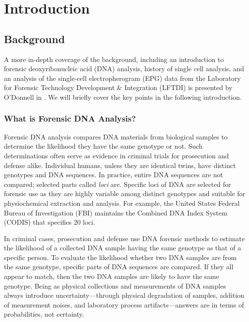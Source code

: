 
\chapter{Introduction}
\label{ch:Introduction}
\thispagestyle{myheadings}

\section{Background}

A more in-depth coverage of the background, including an introduction to forensic deoxyribonucleic acid (DNA) analysis, history of single cell analysis, and an analysis of the single-cell electropherogram (EPG) data from the Laboratory for Forensic Technology Development \& Integration (LFTDI) is presented by O'Donnell in \cite{odonnell_clustering_2021}. We will briefly cover the key points in the following introduction.

\subsection{What is Forensic DNA Analysis?}

Forensic DNA analysis compares DNA materials from biological samples to determine the likelihood they have the same genotype or not. Such determinations often serve as evidence in criminal trials for prosecution and defense alike. Individual humans, unless they are identical twins, have distinct genotypes and DNA sequences. In practice, entire DNA sequences are not compared; selected parts called \emph{loci} are. Specific loci of DNA are selected for forensic use as they are highly variable among distinct genotypes and suitable for physiochemical extraction and analysis. For example, the United States Federal Bureau of Investigation (FBI) maintains the Combined DNA Index System (CODIS) \cite{noauthor_codis_nodate} that specifies 20 loci.

In criminal cases, prosecution and defense use DNA forensic methods to estimate the likelihood of a collected DNA sample having the same genotype as that of a specific person. To evaluate the likelihood whether two DNA samples are from the same genotype, specific parts of DNA sequences are compared. If they all appear to match, then the two DNA samples are likely to have the same genotype. Being as physical collections and measurements of DNA samples always introduce uncertainty---through physical degradation of samples, addition of measurement noises, and laboratory process artifacts---answers are in terms of probabilities, not certainty.

